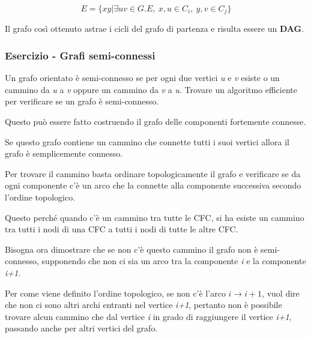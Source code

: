$$ 
E = \{xy | \exists uv \in G.E, \: x,u \in C_i, \: y,v \in C_j\}
$$

Il grafo così ottenuto astrae i cicli del grafo di partenza e risulta essere un \textbf{DAG}.

\subsubsection{Esercizio - Grafi semi-connessi}\label{esercizio---grafi-semiconnessi}

Un grafo orientato è semi-connesso se per ogni due vertici \emph{u} e
\emph{v} esiste o un cammino da \emph{u} a \emph{v} oppure un cammino da
\emph{v} a \emph{u}. Trovare un algoritmo efficiente per verificare se
un grafo è semi-connesso.

Questo può essere fatto costruendo il grafo delle componenti fortemente
connesse.

Se questo grafo contiene un cammino che connette tutti i suoi vertici allora il grafo è semplicemente connesso.

Per trovare il cammino basta ordinare topologicamente il grafo e verificare se da ogni componente c'è un arco che la connette alla componente successiva secondo l'ordine topologico.

Questo perché quando c'è un cammino tra tutte le CFC, si ha esiste un cammino tra tutti i nodi di una CFC a tutti i nodi di tutte le altre CFC.

Bisogna ora dimostrare che se non c'è questo cammino il grafo non è semi-connesso, supponendo che non ci sia un arco tra la componente \textit{i} e la componente \textit{i+1}.

Per come viene definito l'ordine topologico, se non c'è l'arco $i \rightarrow i+1$, vuol dire che non ci sono altri archi entranti nel vertice \textit{i+1}, pertanto non è possibile trovare alcun cammino che dal vertice \textit{i} in grado di raggiungere il vertice \textit{i+1}, passando anche per altri vertici del grafo.